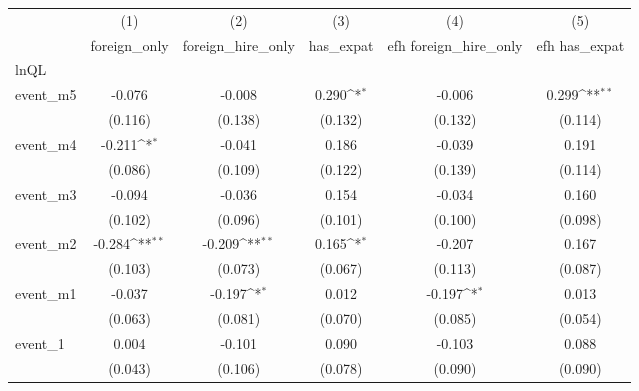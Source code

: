 {
\def\sym#1{\ifmmode^{#1}\else\(^{#1}\)\fi}
\begin{tabular}{l*{5}{c}}
\hline\hline
            &\multicolumn{1}{c}{(1)}&\multicolumn{1}{c}{(2)}&\multicolumn{1}{c}{(3)}&\multicolumn{1}{c}{(4)}&\multicolumn{1}{c}{(5)}\\
            &\multicolumn{1}{c}{foreign\_only}&\multicolumn{1}{c}{foreign\_hire\_only}&\multicolumn{1}{c}{has\_expat}&\multicolumn{1}{c}{efh foreign\_hire\_only}&\multicolumn{1}{c}{efh has\_expat}\\
\hline
lnQL        &                     &                     &                     &                     &                     \\
event\_m5    &      -0.076         &      -0.008         &       0.290\sym{*}  &      -0.006         &       0.299\sym{**} \\
            &     (0.116)         &     (0.138)         &     (0.132)         &     (0.132)         &     (0.114)         \\
[1em]
event\_m4    &      -0.211\sym{*}  &      -0.041         &       0.186         &      -0.039         &       0.191         \\
            &     (0.086)         &     (0.109)         &     (0.122)         &     (0.139)         &     (0.114)         \\
[1em]
event\_m3    &      -0.094         &      -0.036         &       0.154         &      -0.034         &       0.160         \\
            &     (0.102)         &     (0.096)         &     (0.101)         &     (0.100)         &     (0.098)         \\
[1em]
event\_m2    &      -0.284\sym{**} &      -0.209\sym{**} &       0.165\sym{*}  &      -0.207         &       0.167         \\
            &     (0.103)         &     (0.073)         &     (0.067)         &     (0.113)         &     (0.087)         \\
[1em]
event\_m1    &      -0.037         &      -0.197\sym{*}  &       0.012         &      -0.197\sym{*}  &       0.013         \\
            &     (0.063)         &     (0.081)         &     (0.070)         &     (0.085)         &     (0.054)         \\
[1em]
event\_1     &       0.004         &      -0.101         &       0.090         &      -0.103         &       0.088         \\
            &     (0.043)         &     (0.106)         &     (0.078)         &     (0.090)         &     (0.090)         \\

\end{tabular}}
